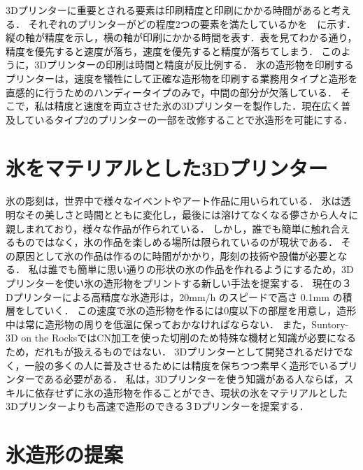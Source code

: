 3Dプリンターに重要とされる要素は印刷精度と印刷にかかる時間があると考える．
それぞれのプリンターがどの程度2つの要素を満たしているかを　に示す．
縦の軸が精度を示し，横の軸が印刷にかかる時間を表す．表を見てわかる通り，精度を優先すると速度が落ち，速度を優先すると精度が落ちてしまう．
このように，3Dプリンターの印刷は時間と精度が反比例する．
氷の造形物を印刷するプリンターは，速度を犠牲にして正確な造形物を印刷する業務用タイプと造形を直感的に行うためのハンディータイプのみで，中間の部分が欠落している．
そこで，私は精度と速度を両立させた氷の3Dプリンターを製作した．現在広く普及しているタイプ2のプリンターの一部を改修することで氷造形を可能にする．

\section{氷をマテリアルとした3Dプリンター}
\label{sec:paragraph2}

氷の彫刻は，世界中で様々なイベントやアート作品に用いられている．
氷は透明なその美しさと時間とともに変化し，最後には溶けてなくなる儚さから人々に親しまれており，様々な作品が作られている．
しかし，誰でも簡単に触れ合えるものではなく，氷の作品を楽しめる場所は限られているのが現状である．
その原因として氷の作品は作るのに時間がかかり，彫刻の技術や設備が必要となる．
私は誰でも簡単に思い通りの形状の氷の作品を作れるようにするため，3Dプリンターを使い氷の造形物をプリントする新しい手法を提案する．
現在の３Dプリンターによる高精度な氷造形は，20mm/h のスピードで高さ 0.1mm の積層をしていく．
この速度で氷の造形物を作るには0度以下の部屋を用意し，造形中は常に造形物の周りを低温に保っておかなければならない．
また，Suntory-3D on the RocksではCN加工を使った切削のため特殊な機材と知識が必要になるため，だれもが扱えるものではない．
3Dプリンターとして開発されるだけでなく，一般の多くの人に普及させるためには精度を保ちつつ素早く造形でいるプリンターである必要がある．
私は，3Dプリンターを使う知識がある人ならば，スキルに依存せずに氷の造形物を作ることができ、現状の氷をマテリアルとした3Dプリンターよりも高速で造形のできる３Dプリンターを提案する．

\section{氷造形の提案}
\label{sec:enum}

